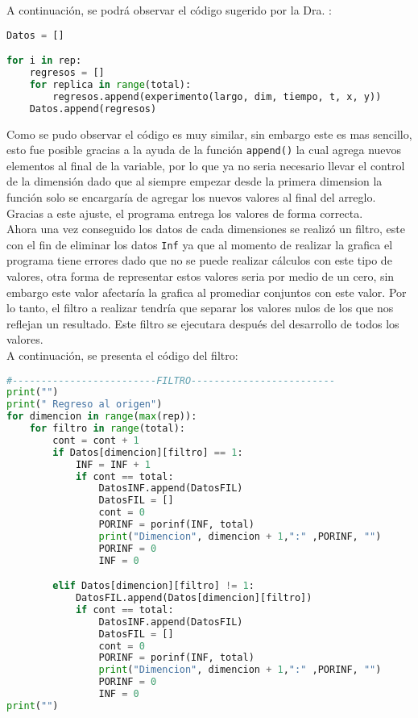 \documentclass{article}
\begin{document}
A continuación, se podrá observar el código sugerido  por la Dra. \citet{DRA.CONV}:\\

\begin{lstlisting}[language=Python]
Datos = []

for i in rep:
    regresos = []       
    for replica in range(total):
        regresos.append(experimento(largo, dim, tiempo, t, x, y))
    Datos.append(regresos)
\end{lstlisting}

Como se pudo observar el código es muy similar, sin embargo  este es mas sencillo, esto fue posible gracias a la ayuda de la función \texttt{append()} la cual agrega nuevos elementos al final de la variable, por lo que ya no seria  necesario llevar el control de la dimensión dado que al siempre empezar desde la primera dimension la función solo se encargaría de agregar los nuevos valores al final del arreglo. Gracias a este ajuste, el programa entrega los valores de forma correcta.\\

Ahora una vez conseguido los datos de cada dimensiones se realizó un filtro, este con el fin de eliminar los datos \texttt{Inf} ya que al momento de realizar la grafica el programa tiene errores dado que no se puede realizar cálculos con este tipo de valores, otra forma de representar estos valores seria por medio de un cero, sin embargo este valor afectaría la grafica al promediar conjuntos con este valor. Por lo tanto, el filtro a realizar tendría que separar los valores nulos de los que nos reflejan un resultado. Este filtro se ejecutara después del desarrollo de todos los valores.\\

A continuación, se presenta el código del filtro:

 \begin{lstlisting}[language=Python]
#-------------------------FILTRO-------------------------
print("")
print(" Regreso al origen")
for dimencion in range(max(rep)):
    for filtro in range(total):
        cont = cont + 1
        if Datos[dimencion][filtro] == 1:
            INF = INF + 1
            if cont == total:
                DatosINF.append(DatosFIL)
                DatosFIL = []
                cont = 0
                PORINF = porinf(INF, total)
                print("Dimencion", dimencion + 1,":" ,PORINF, "")
                PORINF = 0
                INF = 0

        elif Datos[dimencion][filtro] != 1:
            DatosFIL.append(Datos[dimencion][filtro])
            if cont == total:
                DatosINF.append(DatosFIL)
                DatosFIL = []
                cont = 0
                PORINF = porinf(INF, total)
                print("Dimencion", dimencion + 1,":" ,PORINF, "")
                PORINF = 0
                INF = 0
print("")
\end{lstlisting}
\end{document}
